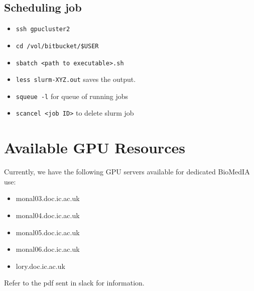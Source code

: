 \documentclass[11pt]{article}
\begin{document}
\subsection*{Scheduling job}

\begin{itemize}
    \item \texttt{ssh gpucluster2}
    \item \texttt{cd /vol/bitbucket/\$USER}
    \item \texttt{sbatch <path to executable>.sh}
    \item \texttt{less slurm-XYZ.out} saves the output.
    \item \verb|squeue -l| for queue of running jobs
    \item \verb|scancel <job ID>| to delete slurm job
\end{itemize}

\section*{Available GPU Resources}

Currently, we have the following GPU servers available for dedicated BioMedIA use:

\begin{itemize}
    \item monal03.doc.ic.ac.uk
    \item monal04.doc.ic.ac.uk
    \item monal05.doc.ic.ac.uk
    \item monal06.doc.ic.ac.uk
    \item lory.doc.ic.ac.uk
\end{itemize}

Refer to the pdf sent in slack for information.
\end{document}
